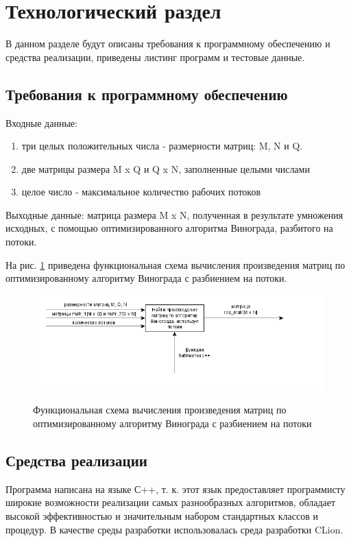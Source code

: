\documentclass[a4paper,14pt]{article}
\begin{document}
  
\pagebreak
\newpage         

\section{Технологический раздел}

	В данном разделе будут описаны требования к программному обеспечению и средства реализации, приведены листинг программ и тестовые данные.
	\subsection{Требования к программному обеспечению}
	Входные данные: 
	 \begin{enumerate} 
	 \item[1)] три целых положительных числа - размерности матриц: M, N и Q.
	 \item[2)] две матрицы размера M x Q и Q x N, заполненные целыми числами
	 \item[3)] целое число - максимальное количество рабочих потоков 
	 \end{enumerate}
	
	Выходные данные: матрица размера M x N, полученная в результате умножения исходных, с помощью оптимизированного алгоритма Винограда, разбитого на потоки.
	
	На рис. \ref{fig:idef0} приведена функциональная схема вычисления произведения матриц по оптимизированному алгоритму Винограда с разбиением на потоки.
        
        \begin{figure}[h!]
        	\begin{center}
        		{\includegraphics[width = \textwidth]{idef0.png}}
        		\caption{Функциональная схема вычисления произведения матриц по оптимизированному алгоритму Винограда с разбиением на потоки}
        		\label{fig:idef0}
        	\end{center}
        \end{figure}
        
	
	\subsection{Средства реализации}
	Программа написана на языке С++, т. к. этот язык предоставляет программисту широкие возможности реализации самых разнообразных алгоритмов, обладает высокой эффективностью и значительным набором стандартных классов и процедур. В качестве среды разработки использовалась среда разработки CLion.
	
\end{document}
